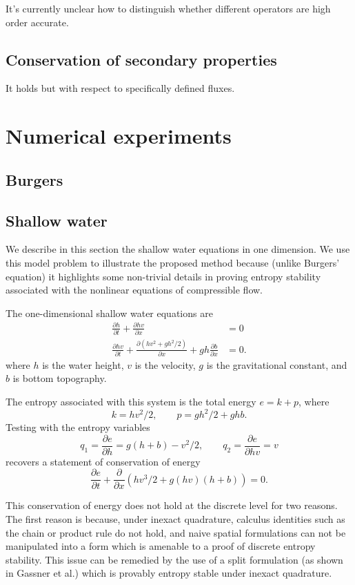 \documentclass[preprint,10pt]{article}
\theoremstyle{definition}
\theoremstyle{lemma}
\theoremstyle{theorem}
\newcommand{\pd}[2]{\frac{\partial#1}{\partial#2}}
\newcommand{\LRp}[1]{\left( #1 \right)}
\begin{document}
It's currently unclear how to distinguish whether different operators are high order accurate.  


\subsection{Conservation of secondary properties}

It holds but with respect to specifically defined fluxes.  

\section{Numerical experiments}

\subsection{Burgers}

\subsection{Shallow water}

We describe in this section the shallow water equations in one dimension.  We use this model problem to illustrate the proposed method because (unlike Burgers' equation) it highlights some non-trivial details in proving entropy stability associated with the nonlinear equations of compressible flow.  

The one-dimensional shallow water equations are 
\begin{align*}
\pd{h}{t} + \pd{hv}{x} &= 0\\
\pd{hv}{t} + \pd{\LRp{hv^2 + gh^2/2}}{x} + gh\pd{b}{x}&= 0.
\end{align*}
where $h$ is the water height, $v$ is the velocity, $g$ is the gravitational constant, and $b$ is bottom topography.  

The entropy associated with this system is the total energy $e = k + p$, where 
\[
k = hv^2/2, \qquad p = gh^2/2 + ghb.
\]
Testing with the entropy variables 
\[
q_1 = \pd{e}{h} = g(h+b)-v^2/2, \qquad q_2 = \pd{e}{hv} = v
\]
recovers a statement of conservation of energy
\[
\pd{e}{t} + \pd{}{x}\LRp{hv^3/2 + g(hv)(h+b)} = 0.  
\]

This conservation of energy does not hold at the discrete level for two reasons.  The first reason is because, under inexact quadrature, calculus identities such as the chain or product rule do not hold, and naive spatial formulations can not be manipulated into a form which is amenable to a proof of discrete entropy stability.  This issue can be remedied by the use of a split formulation (as shown in Gassner et al.) which is provably entropy stable under inexact quadrature.  
\end{document}
